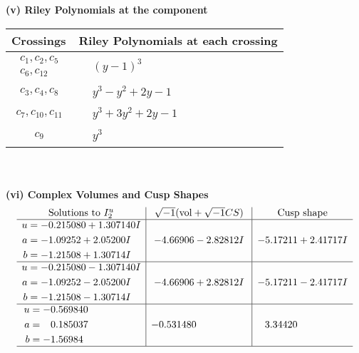 \documentclass[1p]{elsarticle_modified}
\theoremstyle{definition}
\newcommand{\I}{\sqrt{-1}}
\begin{document}
\newpage\renewcommand{\arraystretch}{1}
\flushleft \textbf{(v) Riley Polynomials at the component}\newline \\
\begin{tabular}{m{50pt}|m{274pt}}
Crossings & \hspace{64pt}Riley Polynomials at each crossing \\
\hline $$\begin{aligned}c_{1},c_{2},c_{5}\\c_{6},c_{12}\end{aligned}$$&$\begin{aligned}
&(y-1)^3
\end{aligned}$\\
\hline $$\begin{aligned}c_{3},c_{4},c_{8}\end{aligned}$$&$\begin{aligned}
&y^3- y^2+2 y-1
\end{aligned}$\\
\hline $$\begin{aligned}c_{7},c_{10},c_{11}\end{aligned}$$&$\begin{aligned}
&y^3+3 y^2+2 y-1
\end{aligned}$\\
\hline $$\begin{aligned}c_{9}\end{aligned}$$&$\begin{aligned}
&y^3
\end{aligned}$\\
\hline
\end{tabular}\\~\\
\newpage\flushleft \textbf{(vi) Complex Volumes and Cusp Shapes}
$$\begin{array}{c|c|c}  
\text{Solutions to }I^u_{2}& \I (\text{vol} + \sqrt{-1}CS) & \text{Cusp shape}\\
 \hline 
\begin{aligned}
u &= -0.215080 + 1.307140 I \\
a &= -1.09252 + 2.05200 I \\
b &= -1.21508 + 1.30714 I\end{aligned}
 & -4.66906 - 2.82812 I & -5.17211 + 2.41717 I \\ \hline\begin{aligned}
u &= -0.215080 - 1.307140 I \\
a &= -1.09252 - 2.05200 I \\
b &= -1.21508 - 1.30714 I\end{aligned}
 & -4.66906 + 2.82812 I & -5.17211 - 2.41717 I \\ \hline\begin{aligned}
u &= -0.569840\phantom{ +0.000000I} \\
a &= \phantom{-}0.185037\phantom{ +0.000000I} \\
b &= -1.56984\phantom{ +0.000000I}\end{aligned}
 & -0.531480\phantom{ +0.000000I} & \phantom{-}3.34420\phantom{ +0.000000I}\\
 \hline 
 \end{array}$$\newpage
\end{document}
